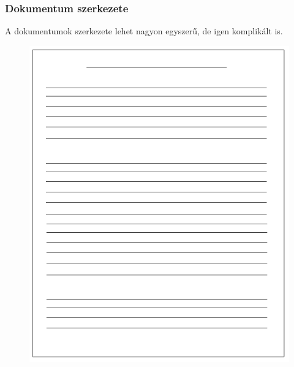 \documentclass{beamer}
\begin{document}
\begin{frame}[fragile]
\frametitle{Dokumentum szerkezete}

A dokumentumok szerkezete lehet nagyon egyszerű, de igen komplikált is.

\smallskip

\begin{figure}[!tbp]
  \centering
  \begin{minipage}[b]{0.45\textwidth}
    \includegraphics[width=\textwidth]{images/page_simple.png}
  \end{minipage}
  \hfill
  \begin{minipage}[b]{0.45\textwidth}

\end{minipage}
\end{figure}
\end{frame}
\end{document}
